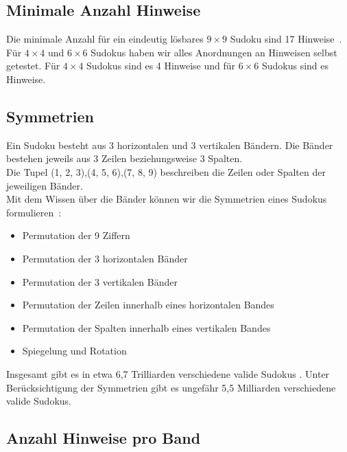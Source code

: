\subsection{Minimale Anzahl Hinweise}
Die minimale Anzahl für ein eindeutig lösbares $9 \times 9$ Sudoku sind 17 Hinweise~\cite{DBLP:journals/corr/abs-1201-0749}.
Für $4 \times 4$ und $6 \times 6$ Sudokus haben wir alles Anordnungen an Hinweisen selbst getestet.
Für $4 \times 4$ Sudokus sind es 4 Hinweise und für $6 \times 6$ Sudokus sind es %
Hinweise.

\subsection{Symmetrien}
Ein Sudoku besteht aus 3 horizontalen und 3 vertikalen Bändern. Die Bänder bestehen jeweils aus 3 Zeilen beziehungsweise 3 Spalten. \\
Die Tupel (1, 2, 3),(4, 5, 6),(7, 8, 9) beschreiben die Zeilen oder Spalten der jeweiligen Bänder. \\
Mit dem Wissen über die Bänder können wir die Symmetrien eines Sudokus formulieren~\cite{russell2006mathematics}: \\
\begin{itemize}
    \item Permutation der 9 Ziffern
    \item Permutation der 3 horizontalen Bänder
    \item Permutation der 3 vertikalen Bänder
    \item Permutation der Zeilen innerhalb eines horizontalen Bandes
    \item Permutation der Spalten innerhalb eines vertikalen Bandes
    \item Spiegelung und Rotation
\end{itemize}
Insgesamt gibt es in etwa 6,7 Trilliarden verschiedene valide Sudokus \cite{felgenhauer2006mathematics}. Unter Berücksichtigung der Symmetrien
gibt es ungefähr 5,5 Milliarden verschiedene valide Sudokus\cite{russell2006mathematics}. \\

\subsection{Anzahl Hinweise pro Band}

